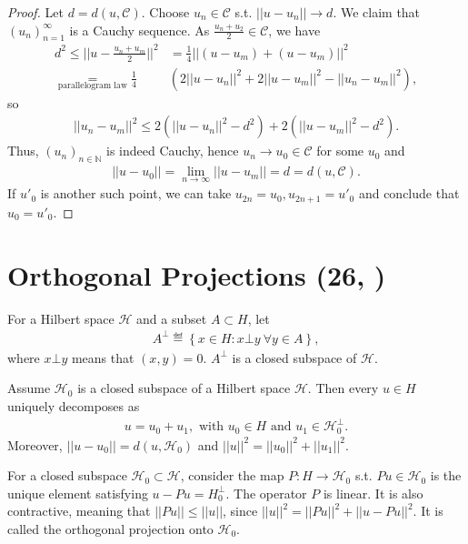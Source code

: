 \ifdetailed 
\begin{proof}
    Let \(d=d(u,\mathcal{C})\). Choose \(u_n\in\mathcal{C}\) s.t. \(||u-u_n||\rightarrow d\). We claim that \((u_n)^{\infty}_{n=1}\) is a 
    Cauchy sequence. As \(\frac{u_n+u_2}{2}\in\mathcal{C}\), we have 
    \begin{align*}
        d^2\leq ||u-\frac{u_n+u_m}{2}||^2 &= \frac{1}{4}||(u-u_m)+(u-u_m)||^2 \\
        \underset{\text{parallelogram law}}{=} \frac{1}{4}&\left(2||u-u_n||^2 + 2||u-u_m||^2 - ||u_n-u_m||^2\right),
    \end{align*}
    so 
    \begin{align*}
        ||u_n-u_m||^2 \leq 2\left( ||u-u_n||^2 - d^2 \right) + 2\left( ||u-u_m||^2 - d^2 \right).
    \end{align*}
    Thus, \((u_n)_{n\in\mathbb{N}}\) is indeed Cauchy, hence \(u_n\rightarrow u_0\in\mathcal{C}\) for some \(u_0\) and
    \begin{align*}
        ||u-u_0|| = \lim\limits_{n\rightarrow\infty} ||u-u_m|| = d = d(u,\mathcal{C}).
    \end{align*}
    If \(u'_0\) is another such point, we can take \(u_{2n}=u_0, u_{2n+1}=u'_0\) and conclude that \(u_0 = u'_0\).
\end{proof}
\fi 
\section{Orthogonal Projections \tiny{(26, \cite{schilling2017measures})}}
For a Hilbert space \(\mathcal{H}\) and a subset \(A\subset H\), let
\begin{align*}
    A^{\bot} \eqdef \left\{x\in H: x\bot y\ \forall y \in A\right\},
\end{align*}
where \(x\bot y\) means that \((x,y) = 0\). \(A^{\bot}\) is a closed subspace of \(\mathcal{H}\).
\begin{proposition}
    Assume \(\mathcal{H}_0\) is a closed subspace of a Hilbert space \(\mathcal{H}\). Then every \(u\in H\) uniquely decomposes as
    \begin{align*}
        u = u_0 + u_1, \text{ with } u_0\in H \text{ and } u_1 \in \mathcal{H}_{0}^{\bot}.
    \end{align*}
    Moreover, \(||u - u_0||= d(u,\mathcal{H}_0)\) and \(||u||^2 = ||u_0||^2 + ||u_1||^2\).
\end{proposition}

For a closed subspace \(\mathcal{H}_0\subset \mathcal{H}\), consider the map \(P:H\rightarrow \mathcal{H}_0\) s.t.
\(Pu\in \mathcal{H}_0\) is the unique element satisfying \(u-Pu = H_{0}^{\bot}\). The operator \(P\) is linear. It is also contractive, meaning that
\(||Pu||\leq ||u||\), since \(||u||^2 = ||Pu||^2 + ||u-Pu||^2\). It is called the orthogonal projection onto \(\mathcal{H}_0\).

